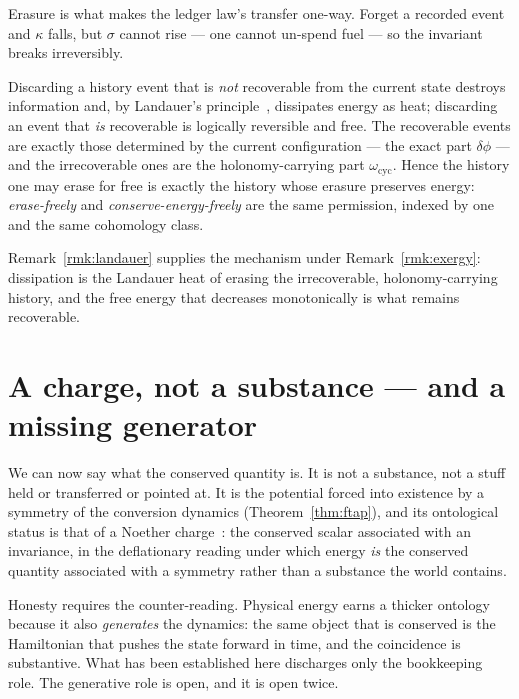 Erasure is what makes the ledger law's transfer one-way.  Forget a
recorded event and $\kappa$ falls, but $\sigma$ cannot rise --- one cannot
un-spend fuel --- so the invariant breaks irreversibly.

\begin{remark}
\label{rmk:landauer}
Discarding a history event that is \emph{not} recoverable from the current
state destroys information and, by Landauer's principle~\cite{Landauer},
dissipates energy as heat; discarding an event that \emph{is} recoverable
is logically reversible and free.  The recoverable events are exactly
those determined by the current configuration --- the exact part
$\delta\phi$ --- and the irrecoverable ones are the holonomy-carrying part
$\omega_{\mathrm{cyc}}$.  Hence the history one may erase for free is
exactly the history whose erasure preserves energy: \emph{erase-freely}
and \emph{conserve-energy-freely} are the same permission, indexed by one
and the same cohomology class.
\end{remark}

Remark~\ref{rmk:landauer} supplies the mechanism under
Remark~\ref{rmk:exergy}: dissipation is the Landauer heat of erasing the
irrecoverable, holonomy-carrying history, and the free energy that
decreases monotonically is what remains recoverable.

\section{A charge, not a substance --- and a missing generator}

We can now say what the conserved quantity is.  It is not a substance,
not a stuff held or transferred or pointed at.  It is the potential forced
into existence by a symmetry of the conversion dynamics
(Theorem~\ref{thm:ftap}), and its ontological status is that of a Noether
charge~\cite{Noether}: the conserved scalar associated with an invariance,
in the deflationary reading under which energy \emph{is} the conserved
quantity associated with a symmetry rather than a substance the world
contains.

Honesty requires the counter-reading.  Physical energy earns a thicker
ontology because it also \emph{generates} the dynamics: the same object
that is conserved is the Hamiltonian that pushes the state forward in
time, and the coincidence is substantive.  What has been established here
discharges only the bookkeeping role.  The generative role is open, and it
is open twice.

